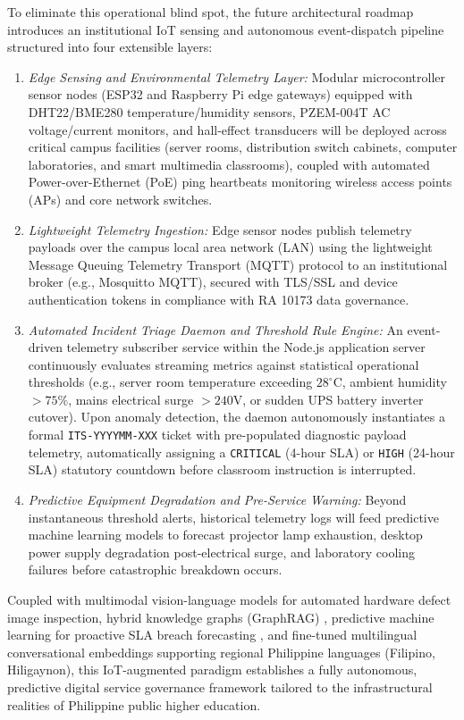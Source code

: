 \documentclass[conference]{IEEEtran}
\begin{document}
To eliminate this operational blind spot, the future architectural roadmap introduces an institutional IoT sensing and autonomous event-dispatch pipeline structured into four extensible layers:
\begin{enumerate}
    \item \textit{Edge Sensing and Environmental Telemetry Layer:} Modular microcontroller sensor nodes (ESP32 and Raspberry Pi edge gateways) equipped with DHT22/BME280 temperature/humidity sensors, PZEM-004T AC voltage/current monitors, and hall-effect transducers will be deployed across critical campus facilities (server rooms, distribution switch cabinets, computer laboratories, and smart multimedia classrooms), coupled with automated Power-over-Ethernet (PoE) ping heartbeats monitoring wireless access points (APs) and core network switches.
    \item \textit{Lightweight Telemetry Ingestion:} Edge sensor nodes publish telemetry payloads over the campus local area network (LAN) using the lightweight Message Queuing Telemetry Transport (MQTT) protocol to an institutional broker (e.g., Mosquitto MQTT), secured with TLS/SSL and device authentication tokens in compliance with RA 10173 \cite{ref28} data governance.
    \item \textit{Automated Incident Triage Daemon and Threshold Rule Engine:} An event-driven telemetry subscriber service within the Node.js application server continuously evaluates streaming metrics against statistical operational thresholds (e.g., server room temperature exceeding $28^\circ\text{C}$, ambient humidity $>75\%$, mains electrical surge $>240\text{V}$, or sudden UPS battery inverter cutover). Upon anomaly detection, the daemon autonomously instantiates a formal \texttt{ITS-YYYYMM-XXX} ticket with pre-populated diagnostic payload telemetry, automatically assigning a \texttt{CRITICAL} (4-hour SLA) or \texttt{HIGH} (24-hour SLA) statutory countdown before classroom instruction is interrupted.
    \item \textit{Predictive Equipment Degradation and Pre-Service Warning:} Beyond instantaneous threshold alerts, historical telemetry logs will feed predictive machine learning models to forecast projector lamp exhaustion, desktop power supply degradation post-electrical surge, and laboratory cooling failures before catastrophic breakdown occurs.
\end{enumerate}

Coupled with multimodal vision-language models for automated hardware defect image inspection, hybrid knowledge graphs (GraphRAG) \cite{ref29}, predictive machine learning for proactive SLA breach forecasting \cite{ref25}, and fine-tuned multilingual conversational embeddings supporting regional Philippine languages (Filipino, Hiligaynon), this IoT-augmented paradigm establishes a fully autonomous, predictive digital service governance framework tailored to the infrastructural realities of Philippine public higher education.
\end{document}
